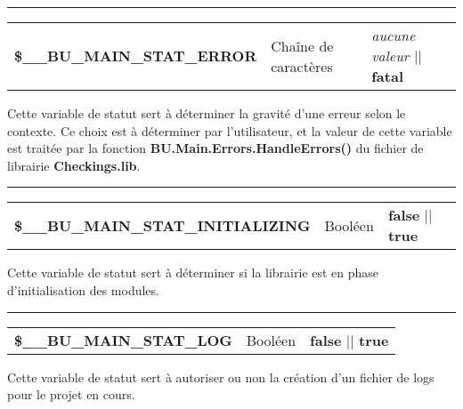 \documentclass[a4paper,10pt]{article}
\begin{document}
\par\noindent\rule{\textwidth}{0.4pt}

\begin{justify}
    \begin{tabular}{l|l|l}
                \textbf{\color{vars}\$\_\_BU\_MAIN\_STAT\_ERROR}  & Chaîne de caractères    & \textit{aucune valeur} || \textbf{fatal}\\[1\baselineskip]
    \end{tabular}
\end{justify}

\begin{justify}
    Cette variable de statut sert à déterminer la gravité d'une erreur selon le contexte. Ce choix est à déterminer par l'utilisateur, et la valeur de cette variable est traitée par la fonction \textbf{\color{func}BU.Main.Errors.HandleErrors()} du fichier de librairie \textbf{\color{lime}Checkings.lib}.
\end{justify}


\par\noindent\rule{\textwidth}{0.4pt}

\begin{justify}
    \begin{tabular}{l|l|l}
        \textbf{\color{vars}\$\_\_BU\_MAIN\_STAT\_INITIALIZING}       & Booléen  & \textbf{false} || \textbf{true}\\[1\baselineskip]
    \end{tabular}
\end{justify}

\begin{justify}
    Cette variable de statut sert à déterminer si la librairie est en phase d'initialisation des modules.
\end{justify}


\par\noindent\rule{\textwidth}{0.4pt}

\begin{justify}
    \begin{tabular}{l|l|l}
        \textbf{\color{vars}\$\_\_BU\_MAIN\_STAT\_LOG}    & Booléen      & \textbf{false} || \textbf{true}\\[1\baselineskip]
    \end{tabular}
\end{justify}

\begin{justify}
    Cette variable de statut sert à autoriser ou non la création d'un fichier de logs pour le projet en cours.
\end{justify}
\end{document}
